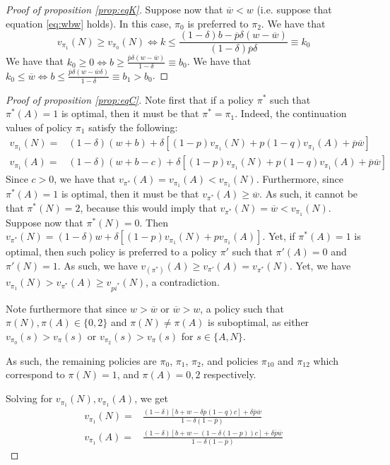 \documentclass[12pt,a4paper]{article}
\theoremstyle{definition}
\newcommand{\wb}{\overline{w}}
\newcommand{\pb}{\overline{p}}
\newcommand{\de}{\delta}
\begin{document}
{\begin{proof}[Proof of proposition \ref{prop:eqK}]
    Suppose now that $\wb < w$ (i.e. suppose that equation \ref{eq:wbw} holds). In this case, $\pi_0$ is preferred to $\pi_2$. We have that 
    $$
    v_{\pi_1}(N) \geq v_{\pi_0}(N) \iff k \leq \frac{(1-\de)b-\pb\de(w-\wb)}{(1-\de)\pb\de} \equiv k_0
    $$
    We have that $k_0 \geq 0 \iff b \geq \frac{\pb\de(w-\wb)}{1-\de} \equiv b_0$. We have that $k_0 \leq \wb \iff b \leq \frac{\pb\de(w-\wb\de)}{1-\de} \equiv b_1 > b_0$. 
\end{proof}

\begin{proof}[Proof of proposition \ref{prop:eqC}]
    Note first that if a policy $\pi^*$ such that $\pi^*(A) = 1$ is optimal, then it must be that $\pi^* = \pi_1$. Indeed, the continuation values of policy $\pi_1$ satisfy the following: 
    \begin{align*}
        v_{\pi_1}(N) =& (1-\de) (w+b) + \de [(1-p) v_{\pi_1}(N) + p(1-q) v_{\pi_1}(A) + \pb \wb] \\ 
        v_{\pi_1}(A) =& (1-\de) (w+b-c) + \de [(1-p) v_{\pi_1}(N) + p(1-q) v_{\pi_1}(A) + \pb \wb]
    \end{align*} 
    Since $c > 0$, we have that $v_{\pi^*}(A) = v_{\pi_1}(A) < v_{\pi_1}(N)$. Furthermore, since $\pi^*(A) = 1$ is optimal, then it must be that $v_{\pi^*}(A) \geq \wb$. As such, it cannot be that $\pi^*(N) = 2$, because this would imply that $v_{\pi^*}(N) = \wb < v_{\pi_1}(N)$. Suppose now that $\pi^*(N) = 0$. Then $v_{\pi^*}(N) = (1-\de) w + \de [(1-p) v_{\pi_1}(N) + p v_{\pi_1}(A)]$. Yet, if $\pi^*(A) = 1$ is optimal, then such policy is preferred to a policy $\pi'$ such that $\pi'(A) = 0$ and $\pi'(N) = 1$. As such, we have $v_(\pi^*)(A) \geq v_{\pi'}(A) = v_{\pi^*}(N)$. Yet, we have $v_{\pi_1}(N) > v_{\pi^*}(A) \geq v_{pi^*}(N)$, a contradiction. 

    Note furthermore that since $w > \wb$ or $\wb > w$, a policy such that $\pi(N), \pi(A) \in \{0,2\}$ and $\pi(N) \neq \pi(A)$ is suboptimal, as either $v_{\pi_0}(s) > v_\pi(s)$ or $v_{\pi_2}(s) > v_\pi(s)$ for $s \in \{A, N\}$. 

    As such, the remaining policies are $\pi_0$, $\pi_1$, $\pi_2$, and policies $\pi_{10}$ and $\pi_{12}$ which correspond to $\pi(N) = 1$, and $\pi(A) = 0, 2$ respectively.
    
    Solving for $v_{\pi_1}(N), v_{\pi_1}(A)$, we get
    \begin{align*}
        v_{\pi_1}(N) =& \frac{(1-\de)[b+w-\de p(1-q)c]+\de\pb\wb}{1 - \de(1-\pb)} \\ 
        v_{\pi_1}(A) =& \frac{(1-\de)[b+w-(1-\de(1-p))c]+\de\pb\wb}{1 - \de(1-\pb)}
    \end{align*}


\end{proof}}
\end{document}
